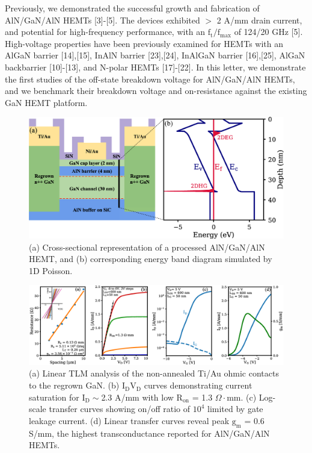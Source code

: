\documentclass[journal]{IEEEtran}
\begin{document}
Previously, we demonstrated the successful growth and fabrication of AlN/GaN/AlN HEMTs [3]-[5]. The devices exhibited $>$ 2 A/mm drain current, and potential for high-frequency performance, with an $\mathrm{f_t}/\mathrm{f_{max}}$ of 124/20 GHz [5]. High-voltage properties have been previously examined for HEMTs with an AlGaN barrier [14],[15], InAlN barrier [23],[24], InAlGaN barrier [16],[25], AlGaN backbarrier [10]-[13], and N-polar HEMTs [17]-[22]. In this letter, we demonstrate the first studies of the off-state breakdown voltage for AlN/GaN/AlN HEMTs, and we benchmark their breakdown voltage and on-resistance against the existing GaN HEMT platform.
\begin{figure}[!b]
\centering
\includegraphics[width=\columnwidth]{Figure1.eps}
\caption{(a) Cross-sectional representation of a processed AlN/GaN/AlN HEMT, and (b) corresponding energy band diagram simulated by 1D Poisson. }
\label{fig:epi}
\end{figure}

\begin{figure}[!t]
\centering
\includegraphics[width=\textwidth]{Figure2_shorter.eps}
\caption{(a) Linear TLM analysis of the non-annealed Ti/Au ohmic contacts to the regrown GaN. (b) $\mathrm{I_DV_D}$ curves demonstrating current saturation for $\mathrm{I_D}\sim$2.3 A/mm with low $\mathrm{R_{on}}$ = 1.3 $\Omega\cdot$mm. (c) Log-scale transfer curves showing on/off ratio of $\mathrm{10^4}$ limited by gate leakage current. (d) Linear transfer curves reveal peak $\mathrm{g_m}$ = 0.6 S/mm, the highest transconductance reported for AlN/GaN/AlN HEMTs. }
\label{fig:IdVg}
\end{figure}
\end{document}
